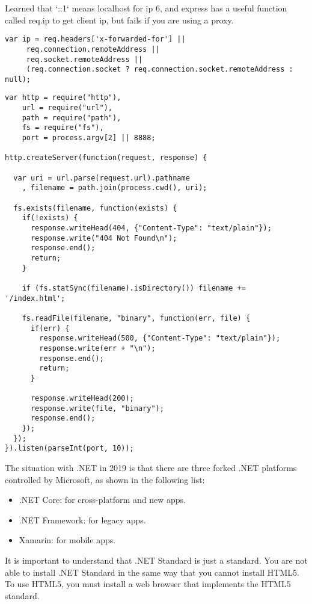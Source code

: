 Learned that `::1` means localhost for ip 6, and express has a useful function called req.ip to get client ip, but fails if you are using a proxy.

\begin{lstlisting}[caption={Javascript Program get ip address}]
var ip = req.headers['x-forwarded-for'] || 
     req.connection.remoteAddress || 
     req.socket.remoteAddress ||
     (req.connection.socket ? req.connection.socket.remoteAddress : null);
\end{lstlisting}

\begin{lstlisting}[caption={Javascript Program HTTP server}]
var http = require("http"),
    url = require("url"),
    path = require("path"),
    fs = require("fs"),
    port = process.argv[2] || 8888;

http.createServer(function(request, response) {

  var uri = url.parse(request.url).pathname
    , filename = path.join(process.cwd(), uri);

  fs.exists(filename, function(exists) {
    if(!exists) {
      response.writeHead(404, {"Content-Type": "text/plain"});
      response.write("404 Not Found\n");
      response.end();
      return;
    }

    if (fs.statSync(filename).isDirectory()) filename += '/index.html';

    fs.readFile(filename, "binary", function(err, file) {
      if(err) {        
        response.writeHead(500, {"Content-Type": "text/plain"});
        response.write(err + "\n");
        response.end();
        return;
      }

      response.writeHead(200);
      response.write(file, "binary");
      response.end();
    });
  });
}).listen(parseInt(port, 10));
\end{lstlisting}

The situation with .NET in 2019 is that there are three forked .NET platforms
controlled by Microsoft, as shown in the following list:

\begin{itemize}
\item .NET Core: for cross-platform and new apps.
\item  .NET Framework: for legacy apps.
\item  Xamarin: for mobile apps.
\end{itemize}

It is important to understand that .NET Standard is just a standard. You are not able
to install .NET Standard in the same way that you cannot install HTML5. To use
HTML5, you must install a web browser that implements the HTML5 standard.